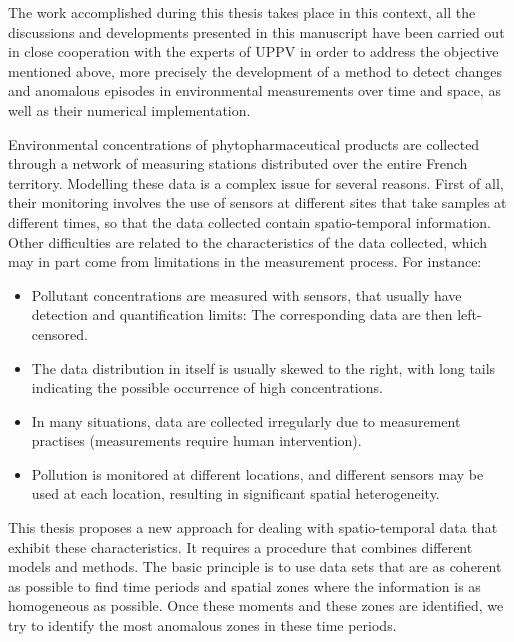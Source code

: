The work accomplished during this thesis takes place in this context, all the discussions and developments presented in this manuscript have been carried out in close cooperation with the experts of UPPV in order to address the objective mentioned above, more precisely the development of a method to detect changes and anomalous episodes in environmental measurements over time and space, as well as their numerical implementation.

Environmental concentrations of phytopharmaceutical products are collected through a network of measuring stations distributed over the entire French territory.  Modelling these data is a complex issue for several reasons. First of all, their monitoring involves the use of sensors at different sites that take samples at different times, so that the data collected contain spatio-temporal information. Other difficulties are related to the characteristics of the data collected, which may in part come from limitations in the measurement process. For instance: 
\begin{itemize}
\item Pollutant concentrations are measured with sensors, that usually have detection and quantification limits: The corresponding data are then left-censored.
\item The data distribution in itself is usually skewed to the right, with long tails indicating the  possible occurrence of high concentrations.
\item In many situations, data are collected irregularly due to measurement practises (measurements require human intervention).
\item Pollution is monitored at different locations, and different sensors may be used at each location, resulting in significant spatial heterogeneity.
\end{itemize}



This thesis proposes a new approach for dealing with spatio-temporal data that exhibit these characteristics. It requires a procedure that combines different models and methods. The basic principle is to use data sets that are as coherent as possible to find time periods and spatial zones where the information is as homogeneous as possible. Once these  moments  and  these  zones  are identified, we try to identify the most anomalous zones in these time periods. 

